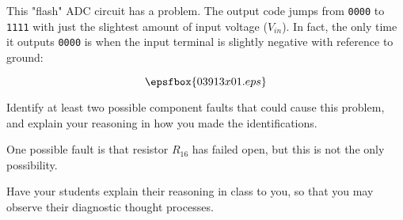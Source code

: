

This "flash" ADC circuit has a problem.  The output code jumps from {\tt 0000} to {\tt 1111} with just the slightest amount of input voltage ($V_{in}$).  In fact, the only time it outputs {\tt 0000} is when the input terminal is slightly negative with reference to ground:

$$\epsfbox{03913x01.eps}$$

Identify at least two possible component faults that could cause this problem, and explain your reasoning in how you made the identifications.







One possible fault is that resistor $R_{16}$ has failed open, but this is not the only possibility.







Have your students explain their reasoning in class to you, so that you may observe their diagnostic thought processes.




